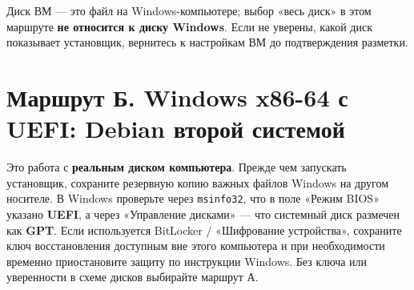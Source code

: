 Диск ВМ --- это файл на Windows-компьютере; выбор «весь диск» в этом
маршруте \textbf{не относится к диску Windows}. Если не уверены, какой
диск показывает установщик, вернитесь к настройкам ВМ до подтверждения
разметки.

\hypertarget{ux43cux430ux440ux448ux440ux443ux442-ux431-windows-x86-64-ux441-uefi-debian-ux432ux442ux43eux440ux43eux439-ux441ux438ux441ux442ux435ux43cux43eux439}{%
\section{Маршрут Б. Windows x86-64 с UEFI: Debian второй
системой}\label{ux43cux430ux440ux448ux440ux443ux442-ux431-windows-x86-64-ux441-uefi-debian-ux432ux442ux43eux440ux43eux439-ux441ux438ux441ux442ux435ux43cux43eux439}}

Это работа с \textbf{реальным диском компьютера}. Прежде чем запускать
установщик, сохраните резервную копию важных файлов Windows на другом
носителе. В Windows проверьте через \texttt{msinfo32}, что в поле «Режим
BIOS» указано \textbf{UEFI}, а через «Управление дисками» --- что
системный диск размечен как \textbf{GPT}. Если используется BitLocker /
«Шифрование устройства», сохраните ключ восстановления доступным вне
этого компьютера и при необходимости временно приостановите защиту по
инструкции Windows. Без ключа или уверенности в схеме дисков выбирайте
маршрут А.

